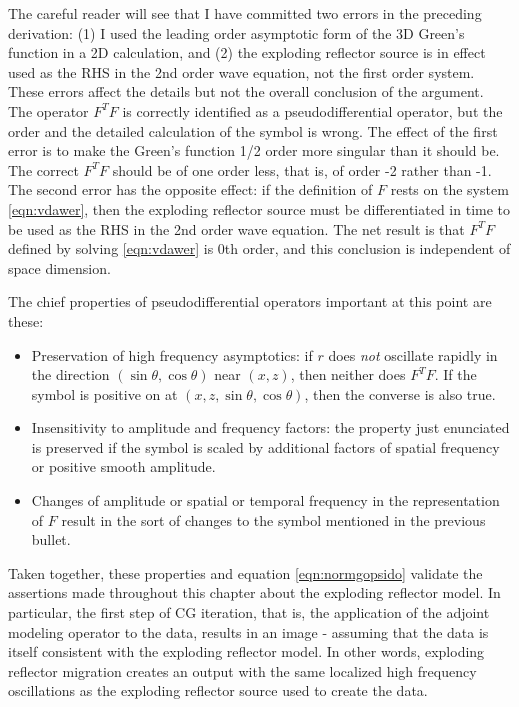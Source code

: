 The careful reader will see that I have committed two errors in the preceding derivation: (1) I used the leading order asymptotic form of the 3D Green's function in a 2D calculation, and (2) the exploding reflector source is in effect used as the RHS in the 2nd order wave equation, not the first order system. These errors affect the details but not the overall conclusion of the argument. The operator $F^TF$ is correctly identified as a pseudodifferential operator, but the order and the detailed calculation of the symbol is wrong. The effect of the first error is to make the Green's function 1/2 order more singular than it should be. The correct $F^TF$ should be of one order less, that is, of order -2 rather than -1. The second error has the opposite effect: if the definition of $F$ rests on the system \ref{eqn:vdawer}, then the exploding reflector source must be differentiated in time to be used as the RHS in the 2nd order wave equation. The net result is that $F^TF$ defined by solving \ref{eqn:vdawer} is 0th order, and this conclusion is independent of space dimension. 

The chief properties of pseudodifferential operators important at this point are these:
\begin{itemize}
\item Preservation of high frequency asymptotics: if $r$ does {\em not} oscillate rapidly in the direction $(\sin \theta,\cos\theta)$ near $(x,z)$, then neither does $F^TF$. If the symbol is positive on at $(x,z,\sin\theta,\cos\theta)$, then the converse is also true.
\item Insensitivity to amplitude and frequency factors: the property just enunciated is preserved if the symbol is scaled by additional factors of spatial frequency or positive smooth amplitude.
\item Changes of amplitude or spatial or temporal frequency in the representation of $F$ result in the sort of changes to the symbol mentioned in the previous bullet.
\end{itemize}

Taken together, these properties and equation \ref{eqn:normgopsido} validate the assertions made throughout this chapter about the exploding reflector model. In particular, the first step of CG iteration, that is, the application of the adjoint modeling operator to the data, results in an image - assuming that the data is itself consistent with the exploding reflector model. In other words, exploding reflector migration creates an output with the same localized high frequency oscillations as the exploding reflector source used to create the data. 

